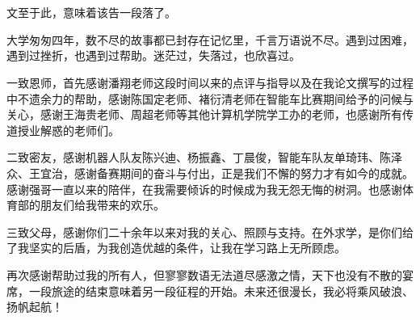
\chapter{\acknowledgementtitle}

文至于此，意味着该告一段落了。

大学匆匆四年，数不尽的故事都已封存在记忆里，千言万语说不尽。遇到过困难，遇到过挫折，也遇到过帮助。迷茫过，失落过，也欣喜过。

一致恩师，首先感谢潘翔老师这段时间以来的点评与指导以及在我论文撰写的过程中不遗余力的帮助，感谢陈国定老师、褚衍清老师在智能车比赛期间给予的问候与关心，感谢王海贵老师、周超老师等其他计算机学院学工办的老师，也感谢所有传道授业解惑的老师们。

二致密友，感谢机器人队友陈兴迪、杨振鑫、丁晨俊，智能车队友单琦玮、陈泽众、王宜治，感谢备赛期间的奋斗与付出，正是我们不懈的努力才有如今的成就。感谢强哥一直以来的陪伴，在我需要倾诉的时候成为我无怨无悔的树洞。也感谢体育部的朋友们给我带来的欢乐。

三致父母，感谢你们二十余年以来对我的关心、照顾与支持。在外求学，是你们给了我坚实的后盾，为我创造优越的条件，让我在学习路上无所顾虑。

再次感谢帮助过我的所有人，但寥寥数语无法道尽感激之情，天下也没有不散的宴席，一段旅途的结束意味着另一段征程的开始。未来还很漫长，我必将乘风破浪、扬帆起航！





